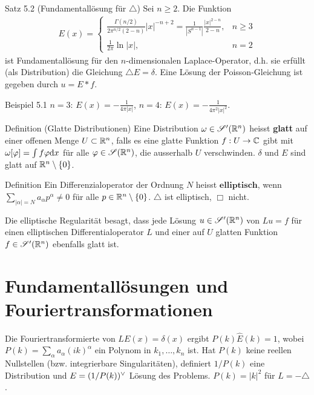 \begin{namedtheorem}{Satz 5.2 (Fundamentallösung für $\triangle$)}
  Sei $n\geq2$. Die Funktion 
  \begin{align*}
    E(x) = \begin{cases}
      \frac{\Gamma(n/2)}{2\pi^{n/2}(2-n)}|x|^{-n+2} = \frac1{|S^{n-1}|} \frac{|x|^{2-n}}{2-n}, & n\geq3 \\
      \frac1{2\pi} \ln |x|, & n=2
    \end{cases}
  \end{align*}
  ist Fundamentallösung für den $n$-dimensionalen Laplace-Operator, d.h. sie erfüllt (als Distribution) die Gleichung $\triangle E = \delta$. Eine Lösung der Poisson-Gleichung ist gegeben durch $u=E\ast f$.
\end{namedtheorem}

\begin{namedtheorem}{Beispiel 5.1}
  $n=3$: $E(x)=-\frac1{4\pi|x|}$, $n=4$: $E(x)=-\frac1{4\pi^2|x|^2}$.
\end{namedtheorem}

\begin{namedtheorem}{Definition (Glatte Distributionen)}
  Eine Distribution $\omega\in\mathscr{S}'(\mathbb{R}^n)$ heisst \textbf{glatt} auf einer offenen Menge $U\subset\mathbb{R}^n$, falls es eine glatte Funktion $f:U\rightarrow\mathbb{C}$ gibt mit $\omega[\varphi]=\int f\varphi\mathrm{d}x$ für alle $\varphi\in\mathscr{S}(\mathbb{R}^n)$, die ausserhalb $U$ verschwinden. $\delta$ und $E$ sind glatt auf $\mathbb{R}^n\setminus\{0\}$.
\end{namedtheorem}

\begin{namedtheorem}{Definition}
  Ein Differenzialoperator der Ordnung $N$ heisst $\textbf{elliptisch}$, wenn $\sum_{|\alpha|=N}a_{\alpha}p^{\alpha}\neq0$ für alle $p\in\mathbb{R}^n\setminus\{0\}$. $\triangle$ ist elliptisch, $\Box$ nicht.
\end{namedtheorem}

Die elliptische Regularität besagt, dass jede Lösung $u\in\mathscr{S}'(\mathbb{R}^n)$ von $Lu=f$ für einen elliptischen Differentialoperator $L$ und einer auf $U$ glatten Funktion $f\in\mathscr{S}'(\mathbb{R}^n)$ ebenfalls glatt ist.

\section{Fundamentallösungen und Fouriertransformationen}

Die Fouriertransformierte von $LE(x)=\delta(x)$ ergibt $P(k)\hat{E}(k)=1$, wobei $P(k)=\sum_{\alpha}a_{\alpha}(ik)^{\alpha}$ ein Polynom in $k_1,\ldots,k_n$ ist. Hat $P(k)$ keine reellen Nullstellen (bzw. integrierbare Singularitäten), definiert $1/P(k)$ eine Distribution und $E=(1/P(k)){}^{\vee}$ Lösung des Problems. $P(k)=|k|^2$ für $L=-\triangle$.

